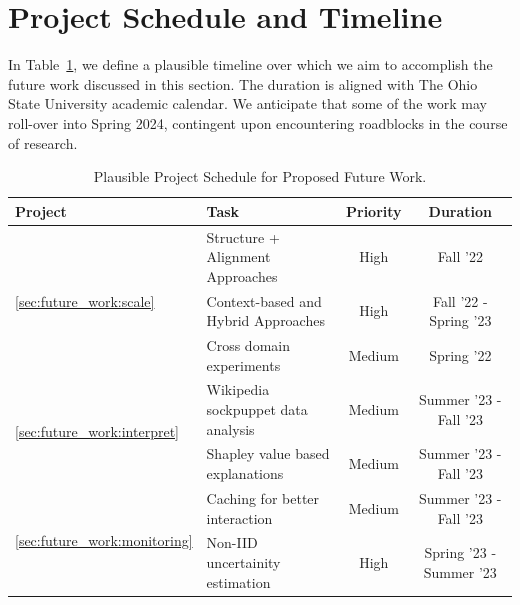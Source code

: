 \section{Project Schedule and Timeline}
In Table~\ref{tab:future_work:timeline}, we define a plausible timeline over which we aim to accomplish the future work discussed in this section.
The duration is aligned with The Ohio State University academic calendar.
We anticipate that some of the work may roll-over into Spring 2024, contingent upon encountering roadblocks in the course of research.

\begin{table}
    \centering
    \begin{tabular}{llcc}
    \toprule
        Project & Task & Priority & Duration  \\
        \midrule 
     \multirow{3}{*}{\ref{sec:future_work:scale}} & Structure + Alignment Approaches & High & Fall '22\\
        & Context-based and Hybrid Approaches & High & Fall '22 - Spring '23 \\
        & Cross domain experiments & Medium & Spring '22 \\
    \midrule
    \multirow{2}{*}{\ref{sec:future_work:interpret}} & Wikipedia sockpuppet data analysis & Medium & Summer '23 - Fall '23  \\
    & Shapley value based explanations & Medium & Summer '23 - Fall '23\\
    \midrule 
    \multirow{2}{*}{\ref{sec:future_work:monitoring}} & Caching for better interaction & Medium & Summer '23 - Fall '23\\
    & Non-IID uncertainity estimation & High & Spring '23 - Summer '23\\
    \bottomrule
    \end{tabular}
    \caption{Plausible Project Schedule for Proposed Future Work.}
    \label{tab:future_work:timeline}
\end{table}

\endinput